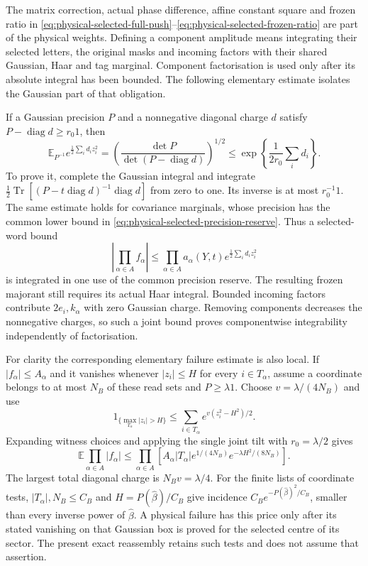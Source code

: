 \documentclass[11pt,reqno]{amsart}
\numberwithin{equation}{section}
\theoremstyle{definition}
\theoremstyle{remark}
\begin{document}
The matrix correction, actual phase difference, affine constant
square and frozen ratio in
\eqref{eq:physical-selected-full-push}--\eqref{eq:physical-selected-frozen-ratio}
are part of the physical weights. Defining a component amplitude
means integrating their selected letters, the original masks and
incoming factors with their shared Gaussian, Haar and tag marginal.
Component factorisation is used only after its absolute integral
has been bounded. The following elementary estimate isolates the
Gaussian part of that obligation.

If a Gaussian precision \(P\) and a nonnegative diagonal charge
\(d\) satisfy \(P-\operatorname{diag}d\ge r_0 1\), then
\begin{equation}
 \mathbb E_{P^{-1}}e^{\frac12\sum_i d_i z_i^2}
   =\left(\frac{\det P}{\det(P-\operatorname{diag}d)}\right)^{1/2}
                  \le\exp\!\left\{\frac1{2r_0}\sum_i d_i\right\}.
 \label{eq:reassembly-joint-Gaussian-tilt}
\end{equation}
To prove it, complete the Gaussian integral and integrate
\(\frac12\operatorname{Tr}[(P-t\operatorname{diag}d)^{-1}
\operatorname{diag}d]\) from zero to one. Its inverse is at
most \(r_0^{-1}1\). The same estimate holds for covariance
marginals, whose precision has the common lower bound in
\eqref{eq:physical-selected-precision-reserve}.
Thus a selected-word bound
\[
 \left|\prod_{\alpha\in A}f_\alpha\right|
       \le\prod_{\alpha\in A}a_\alpha(Y,t)
                            e^{\frac12\sum_i d_i z_i^2}
\]
is integrated in one use of the common precision reserve.
The resulting frozen majorant still requires its actual Haar
integral. Bounded incoming factors contribute \(2e_i,k_\alpha\)
with zero Gaussian charge. Removing components decreases the
nonnegative charges, so such a joint bound proves componentwise
integrability independently of factorisation.

For clarity the corresponding elementary failure estimate is also
local. If \(|f_\alpha|\le A_\alpha\) and it vanishes whenever
\(|z_i|\le H\) for every \(i\in T_\alpha\), assume a coordinate
belongs to at most \(N_B\) of these read sets and \(P\ge\lambda1\).
Choose \(v=\lambda/(4N_B)\) and use
\[
 1_{\{\max_{T_\alpha}|z_i|>H\}}
       \le\sum_{i\in T_\alpha}e^{v(z_i^2-H^2)/2}.
\]
Expanding witness choices and applying the single joint tilt with
\(r_0=\lambda/2\) gives
\begin{equation}
 \mathbb E\prod_{\alpha\in A}|f_\alpha|
  \le\prod_{\alpha\in A}
       [A_\alpha|T_\alpha|e^{1/(4N_B)}e^{-\lambda H^2/(8N_B)}].
 \label{eq:reassembly-failure-witnesses}
\end{equation}
The largest total diagonal charge is \(N_Bv=\lambda/4\).
For the finite lists of coordinate tests,
\(|T_\alpha|,N_B\le C_B\) and
\(H=P(\widehat\beta)/C_B\) give incidence
\(C_Be^{-P(\widehat\beta)^2/C_B}\), smaller than every inverse
power of \(\widehat\beta\). A physical failure has this price
only after its stated vanishing on that Gaussian box is proved
for the selected centre of its sector. The present exact
reassembly retains such tests and does not assume that assertion.
\end{document}

